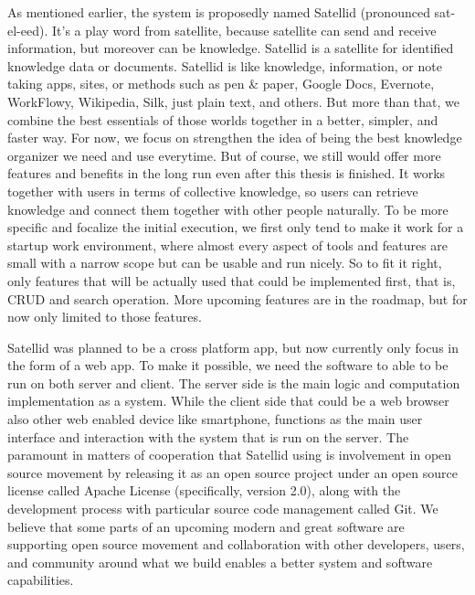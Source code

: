 As mentioned earlier, the system is proposedly named Satellid (pronounced sat-el-eed). It's a play word from satellite, because satellite can send and receive information, but moreover can be knowledge.
Satellid is a satellite for identified knowledge data or documents.
Satellid is like knowledge, information, or note taking apps, sites, or methods such as pen \& paper, Google Docs, Evernote, WorkFlowy, Wikipedia, Silk, just plain text, and others.
But more than that, we combine the best essentials of those worlds together in a better, simpler, and faster way.
For now, we focus on strengthen the idea of being the best knowledge organizer we need and use everytime.
But of course, we still would offer more features and benefits in the long run even after this thesis is finished.
It works together with users in terms of collective knowledge, so users can retrieve knowledge and connect them together with other people naturally.
To be more specific and focalize the initial execution, we first only tend to make it work for a startup work environment, where almost every aspect of tools and features are small with a narrow scope but can be usable and run nicely.
So to fit it right, only features that will be actually used that could be implemented first, that is, \ac{CRUD} and search operation.
More upcoming features are in the roadmap, but for now only limited to those features.

Satellid was planned to be a cross platform app, but now currently only focus in the form of a web app.
To make it possible, we need the software to able to be run on both server and client.
The server side is the main logic and computation implementation as a system.
While the client side that could be a web browser also other web enabled device like smartphone, functions as the main user interface and interaction with the system that is run on the server.
The paramount in matters of cooperation that Satellid using is involvement in open source movement by releasing it as an open source project under an open source license called Apache License (specifically, version 2.0), along with the development process with particular source code management called Git.
We believe that some parts of an upcoming modern and great software are supporting open source movement and collaboration with other developers, users, and community around what we build enables a better system and software capabilities.
